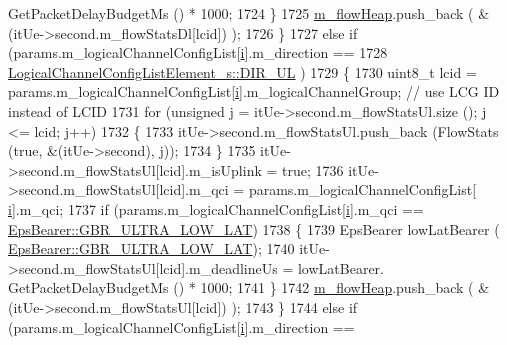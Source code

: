 \begin{DoxyCode}
      GetPacketDelayBudgetMs () * 1000;
1724                         \}
1725                         \hyperlink{classns3_1_1MmWaveFlexTtiMaxRateMacScheduler_ab7efbde2b050b26442c6d9f9901f7217}{m\_flowHeap}.push\_back ( &(itUe->second.m\_flowStatsDl[lcid]) );
1726                 \}
1727                 \textcolor{keywordflow}{else} \textcolor{keywordflow}{if} (params.m\_logicalChannelConfigList[\hyperlink{bernuolliDistribution_8m_a6f6ccfcf58b31cb6412107d9d5281426}{i}].m\_direction ==
1728                                 \hyperlink{structns3_1_1LogicalChannelConfigListElement__s_a0ce1e3a6af4d9a3e9fc19361d0af4e00acc9eb2fd165cc693771639203d6212a9}{LogicalChannelConfigListElement\_s::DIR\_UL}
      )
1729                 \{
1730                 uint8\_t lcid = params.m\_logicalChannelConfigList[\hyperlink{bernuolliDistribution_8m_a6f6ccfcf58b31cb6412107d9d5281426}{i}].m\_logicalChannelGroup; \textcolor{comment}{// use LCG ID
       instead of LCID}
1731                 \textcolor{keywordflow}{for} (\textcolor{keywordtype}{unsigned} j = itUe->second.m\_flowStatsUl.size (); j <= lcid; j++)
1732                 \{
1733                         itUe->second.m\_flowStatsUl.push\_back (FlowStats (\textcolor{keyword}{true}, &(itUe->second), j));
1734                 \}
1735                         itUe->second.m\_flowStatsUl[lcid].m\_isUplink = \textcolor{keyword}{true};
1736                         itUe->second.m\_flowStatsUl[lcid].m\_qci = params.m\_logicalChannelConfigList[
      \hyperlink{bernuolliDistribution_8m_a6f6ccfcf58b31cb6412107d9d5281426}{i}].m\_qci;
1737                         \textcolor{keywordflow}{if} (params.m\_logicalChannelConfigList[\hyperlink{bernuolliDistribution_8m_a6f6ccfcf58b31cb6412107d9d5281426}{i}].m\_qci == 
      \hyperlink{structns3_1_1EpsBearer_aecf0c67109c5eb4ec0b07226fff5885ea1b3267491c7ea82ddc90b433c429c7c1}{EpsBearer::GBR\_ULTRA\_LOW\_LAT})
1738                         \{
1739                                 EpsBearer lowLatBearer (
      \hyperlink{structns3_1_1EpsBearer_aecf0c67109c5eb4ec0b07226fff5885ea1b3267491c7ea82ddc90b433c429c7c1}{EpsBearer::GBR\_ULTRA\_LOW\_LAT});
1740                                 itUe->second.m\_flowStatsUl[lcid].m\_deadlineUs = lowLatBearer.
      GetPacketDelayBudgetMs () * 1000;
1741                         \}
1742                         \hyperlink{classns3_1_1MmWaveFlexTtiMaxRateMacScheduler_ab7efbde2b050b26442c6d9f9901f7217}{m\_flowHeap}.push\_back ( &(itUe->second.m\_flowStatsUl[lcid]) );
1743                 \}
1744                 \textcolor{keywordflow}{else} \textcolor{keywordflow}{if} (params.m\_logicalChannelConfigList[\hyperlink{bernuolliDistribution_8m_a6f6ccfcf58b31cb6412107d9d5281426}{i}].m\_direction ==

\end{DoxyCode}
